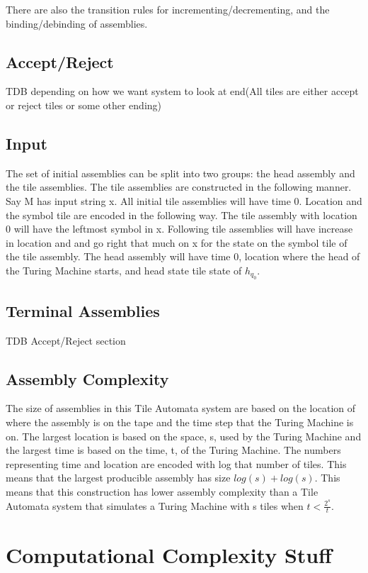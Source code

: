 \documentclass{article}
\begin{document}
There are also the transition rules for incrementing/decrementing, and the binding/debinding of
assemblies.

\subsection{Accept/Reject}
TDB depending on how we want system to look at end(All tiles are either accept or reject tiles or
some other ending)


\subsection{Input}
The set of initial assemblies can be split into two groups: the head assembly and the tile
assemblies.  The tile assemblies are constructed in the following manner.  Say M has input string
x.  All initial tile assemblies will have time 0.  Location and the symbol tile are encoded in the
following way.  The tile assembly with location 0 will have the leftmost symbol in x.  Following
tile assemblies will have increase in location and and go right that much on x for the state on
the symbol tile of the tile assembly.  The head assembly will have time 0, location where the head
of the Turing Machine starts, and head state tile state of $h_{q_0}$.

\subsection{Terminal Assemblies}
TDB Accept/Reject section

\subsection{Assembly Complexity}
The size of assemblies in this Tile Automata system are based on the location of where the assembly
is on the tape and the time step that the Turing Machine is on.  The largest location is based on
the space, s, used by the Turing Machine and the largest time is based on the time, t, of the Turing
Machine.  The numbers representing time and location are encoded with log that number of tiles.
This means that the largest producible assembly has size $log(s)+log(s)$.  This means that this
construction has lower assembly complexity than a Tile Automata system that simulates a Turing Machine with s tiles when $t < \frac{2^s}{t}$.


\section{Computational Complexity Stuff}
\end{document}
